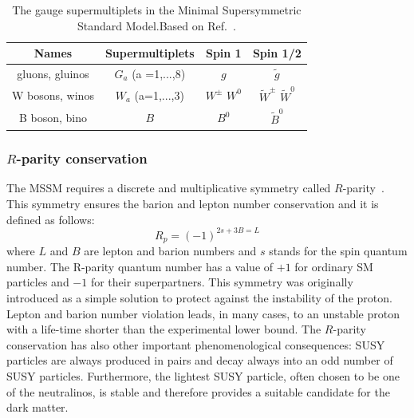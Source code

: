 \begin{table}
\begin{center}
\renewcommand{\arraystretch}{1.5}
\begin{tabular}{c|ccc}
Names			&Supermultiplets& Spin 1 		&	Spin 1/2 \\
\hline
gluons, gluinos		&$G_a$ (a =1,...,8)	& $g$			& $\tilde{g}$	\\
W bosons, winos		& $W_a$ (a=1,...,3)	& $W^{\pm}$ $W^0$	& $\tilde{W}^{\pm}$ $\tilde{W}^0$ \\
B boson, bino		&$B$			& $B^0$			& $\tilde{B}^0$ \\
\hline
\end{tabular}
\caption{ The gauge supermultiplets in the Minimal Supersymmetric Standard Model.Based on Ref.~\cite{SusyPrimer}.}
\label{tab:gaugesup}
\end{center}
\end{table}

\subsubsection{$R$-parity conservation}
The MSSM requires a discrete and multiplicative symmetry called $R$-parity~\cite{Susy3}. This symmetry ensures the barion and lepton number 
conservation and it is defined as follows:
\begin{equation}
R_p = (-1)^{2s+3B=L}
\end{equation}
where $L$ and $B$ are lepton and barion numbers and $s$ stands for the spin quantum number. The R-parity quantum number has a value of $+1$ for ordinary
SM particles and $-1$ for their superpartners. This symmetry was originally introduced as a simple solution to protect against the instability of the proton.
Lepton and barion number violation leads, in many cases, 
to an unstable proton with a life-time shorter than the experimental lower bound. The $R$-parity conservation has also other important 
phenomenological consequences: SUSY particles are always produced in pairs and decay always into an odd number of SUSY particles.
Furthermore, the lightest SUSY particle, often chosen to be one of the neutralinos, is stable and therefore provides a suitable 
candidate for the dark matter.


